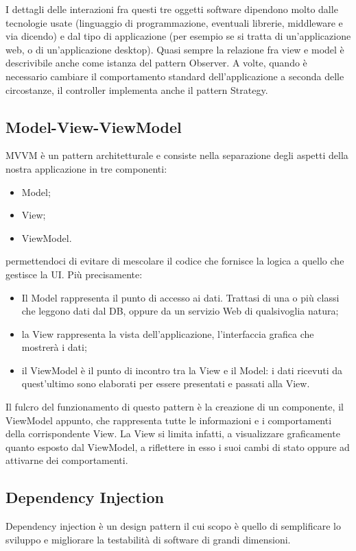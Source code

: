 I dettagli delle interazioni fra questi tre oggetti software dipendono molto dalle tecnologie usate (linguaggio di programmazione, eventuali librerie, middleware e via dicendo) e dal tipo di applicazione (per esempio se si tratta di un'applicazione web, o di un'applicazione desktop). Quasi sempre la relazione fra view e model è descrivibile anche come istanza del pattern Observer. A volte, quando è necessario cambiare il comportamento standard dell'applicazione a seconda delle circostanze, il controller implementa anche il pattern Strategy.

\subsection{Model-View-ViewModel}
MVVM è un pattern architetturale e consiste nella separazione degli aspetti della nostra applicazione in tre componenti:
\begin{itemize}
\item Model;
\item View;
\item ViewModel.
\end{itemize}
permettendoci di evitare di mescolare il codice che fornisce la logica a quello che gestisce la UI.
Più precisamente:
\begin{itemize}
	\item Il Model rappresenta il punto di accesso ai dati. Trattasi di una o più classi che leggono dati dal DB, oppure da un servizio Web di qualsivoglia natura;
	\item la View rappresenta la vista dell’applicazione, l’interfaccia grafica che mostrerà i dati;
	\item il ViewModel è il punto di incontro tra la View e il Model: i dati ricevuti da quest’ultimo sono elaborati per essere presentati e passati alla View.
\end{itemize}

Il fulcro del funzionamento di questo pattern è la creazione di un componente, il ViewModel appunto, che rappresenta tutte le informazioni e i comportamenti della corrispondente View. La View si limita infatti, a visualizzare graficamente quanto esposto dal ViewModel, a riflettere in esso i suoi cambi di stato oppure ad attivarne dei comportamenti.
\subsection{Dependency Injection}
Dependency injection è un design pattern il cui scopo è quello di semplificare lo sviluppo e migliorare la testabilità di software di grandi dimensioni.

